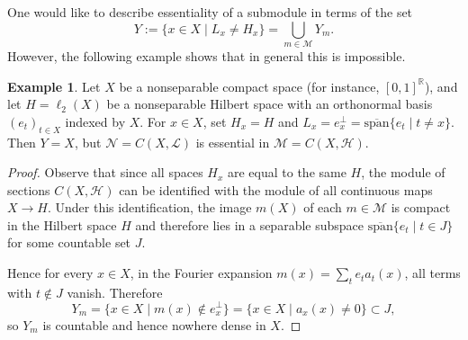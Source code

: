 \documentclass[reqno,a4paper,12pt]{amsart}
\theoremstyle{plain}
\theoremstyle{definition}
\newtheorem{example}[theorem]{Example}
\newcommand{\RR}{\mathbb R}
\newcommand{\M}{\mathcal M}
\newcommand{\N}{\mathcal N}
\begin{document}
	One would like to describe essentiality of a submodule in terms of the set
	\[ Y := \{ x \in X \mid L_x \ne H_x \} = \bigcup_{m \in \M}Y_m. \]
	However, the following example shows that in general this is impossible.
	
	\begin{example}
		Let $X$ be a nonseparable compact space (for instance, $[0,1]^\RR$), and let $H = \ell_2(X)$ be a nonseparable Hilbert space with an orthonormal basis $(e_t)_{t \in X}$ indexed by $X$.
		For $x \in X$, set $H_x = H$ and $L_x = e_x^\bot = \overline{\mathrm{span}}\{e_t \mid t \ne x\}$.
		Then $Y = X$, but $\N = C(X, \mathcal L)$ is essential in $\M = C(X, \mathcal H)$.
	\end{example}
	\begin{proof}
		Observe that since all spaces $H_x$ are equal to the same $H$, the module of sections $C(X, \mathcal H)$ can be identified with the module of all continuous maps $X \to H$.
		Under this identification, the image $m(X)$ of each $m \in \M$ is compact in the Hilbert space $H$ and therefore lies in a separable subspace $\overline{\mathrm{span}}\{e_t \mid t \in J\}$ for some countable set $J$.
		
		Hence for every $x \in X$, in the Fourier expansion $m(x) = \sum_t e_t a_t(x)$, all terms with $t \notin J$ vanish.
		Therefore
		\[
		Y_m = \{x \in X \mid m(x) \notin e_x^\bot\} = \{x \in X \mid a_x(x) \ne 0\} \subset J,
		\]
		so $Y_m$ is countable and hence nowhere dense in $X$.
	\end{proof}
	
\end{document}
